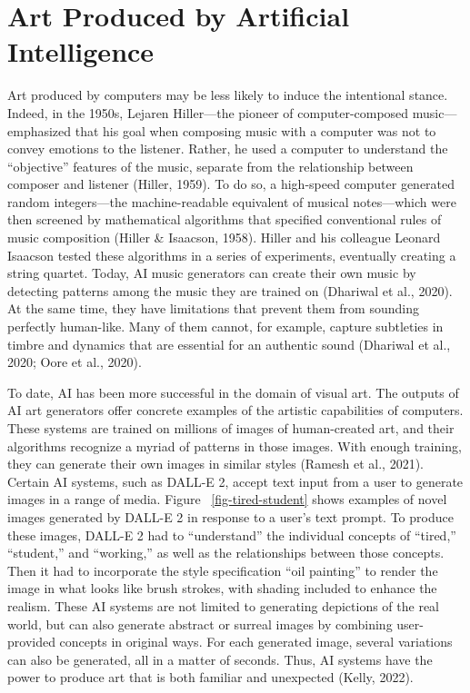 \documentclass[12pt,twoside]{reedthesis}
\begin{document}
\section{Art Produced by Artificial Intelligence
}
Art produced by computers may be less likely to induce the intentional stance. Indeed, in the 1950s, Lejaren Hiller—the pioneer of computer-composed music—emphasized that his goal when composing music with a computer was not to convey emotions to the listener. Rather, he used a computer to understand the “objective” features of the music, separate from the relationship between composer and listener (Hiller, 1959). To do so, a high-speed computer generated random integers—the machine-readable equivalent of musical notes—which were then screened by mathematical algorithms that specified conventional rules of music composition (Hiller \& Isaacson, 1958). Hiller and his colleague Leonard Isaacson tested these algorithms in a series of experiments, eventually creating a string quartet. Today, AI music generators can create their own music by detecting patterns among the music they are trained on (Dhariwal et al., 2020). At the same time, they have limitations that prevent them from sounding perfectly human-like. Many of them cannot, for example, capture subtleties in timbre and dynamics that are essential for an authentic sound (Dhariwal et al., 2020; Oore et al., 2020). 

To date, AI has been more successful in the domain of visual art. The outputs of AI art generators offer concrete examples of the artistic capabilities of computers. These systems are trained on millions of images of human-created art, and their algorithms recognize a myriad of patterns in those images. With enough training, they can generate their own images in similar styles (Ramesh et al., 2021). Certain AI systems, such as DALL-E 2, accept text input from a user to generate images in a range of media. Figure ~\ref{fig-tired-student} shows examples of novel images generated by DALL-E 2 in response to a user’s text prompt. To produce these images, DALL-E 2 had to “understand” the individual concepts of “tired,” “student,” and “working,” as well as the relationships between those concepts. Then it had to incorporate the style specification “oil painting” to render the image in what looks like brush strokes, with shading included to enhance the realism. These AI systems are not limited to generating depictions of the real world, but can also generate abstract or surreal images by combining user-provided concepts in original ways. For each generated image, several variations can also be generated, all in a matter of seconds. Thus, AI systems have the power to produce art that is both familiar and unexpected (Kelly, 2022).
\end{document}

